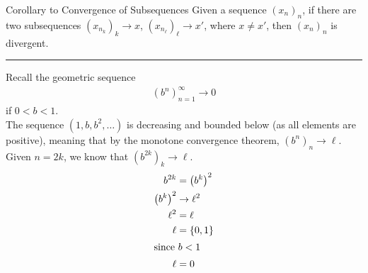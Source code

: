 \documentclass[10pt]{extarticle}
\begin{document}
  \begin{problem}{Corollary to Convergence of Subsequences}
    Given a sequence $(x_n)_n$, if there are two subsequences $(x_{n_k})_k \rightarrow x$, $(x_{n_\ell})_{\ell} \rightarrow x'$, where $x \neq x'$, then $(x_n)_n$ is divergent.\\
    \vspace{4pt}
    \rule{\textwidth}{0.4pt}
    \vspace{4pt}
    Recall the geometric sequence
    \begin{align*}
      (b^n)_{n=1}^{\infty} \rightarrow 0
    \end{align*}
    if $0 < b < 1$.\\

    The sequence $(1,b,b^2,\dots)$ is decreasing and bounded below (as all elements are positive), meaning that by the monotone convergence theorem, $(b^n)_{n} \rightarrow \ell$.\\

    Given $n = 2k$, we know that $(b^{2k})_k \rightarrow \ell$.
    \begin{align*}
      b^{2k} &= \left(b^k\right)^2\\
      \left(b^k\right)^2 &\rightarrow \ell^2\\
      \ell^2 &= \ell\\
      \ell &= \{0,1\}\\
      \shortintertext{since $b < 1$}
      \ell &= 0
    \end{align*}
  \end{problem}
\end{document}
